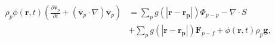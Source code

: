 \begin{equation}
\begin{align*}
\rho_p \phi (\mathbf{r}, t) \left(\frac{\partial
\mathbf{\overline{v}}_p}{\partial t} + ( \mathbf{\overline{v}}_p \cdot \nabla)
\mathbf{\overline{v}}_p \right) 
& = 
\sum_{p}{g(|\mathbf{r} - \mathbf{r_p}|)\Phi_{p-p}}
- \nabla \cdot S \\ 
& + \sum_{p}{g(|\mathbf{r} - \mathbf{r_p}|)\mathbf{F}_{p-f}} 
+ \phi(\mathbf{r}, t) \rho_p \mathbf{g} ,
\end{align*}
 \label{eq:eom3}
\end{equation}

